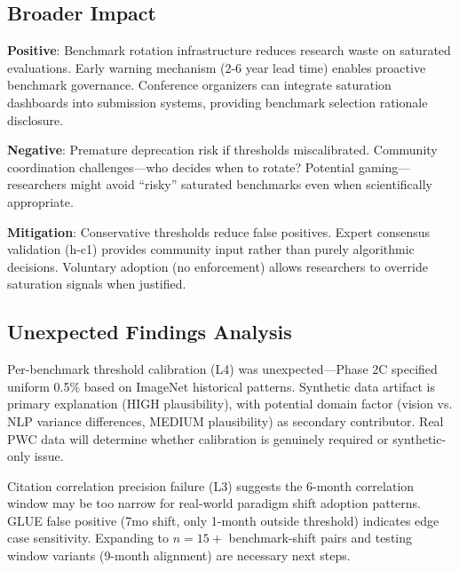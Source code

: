 \subsection{Broader Impact}

\textbf{Positive}: Benchmark rotation infrastructure reduces research waste on saturated evaluations. Early warning mechanism (2-6 year lead time) enables proactive benchmark governance. Conference organizers can integrate saturation dashboards into submission systems, providing benchmark selection rationale disclosure.

\textbf{Negative}: Premature deprecation risk if thresholds miscalibrated. Community coordination challenges---who decides when to rotate? Potential gaming---researchers might avoid ``risky'' saturated benchmarks even when scientifically appropriate.

\textbf{Mitigation}: Conservative thresholds reduce false positives. Expert consensus validation (h-c1) provides community input rather than purely algorithmic decisions. Voluntary adoption (no enforcement) allows researchers to override saturation signals when justified.

\subsection{Unexpected Findings Analysis}

Per-benchmark threshold calibration (L4) was unexpected---Phase 2C specified uniform 0.5\% based on ImageNet historical patterns. Synthetic data artifact is primary explanation (HIGH plausibility), with potential domain factor (vision vs. NLP variance differences, MEDIUM plausibility) as secondary contributor. Real PWC data will determine whether calibration is genuinely required or synthetic-only issue.

Citation correlation precision failure (L3) suggests the 6-month correlation window may be too narrow for real-world paradigm shift adoption patterns. GLUE false positive (7mo shift, only 1-month outside threshold) indicates edge case sensitivity. Expanding to $n=15+$ benchmark-shift pairs and testing window variants (9-month alignment) are necessary next steps.
